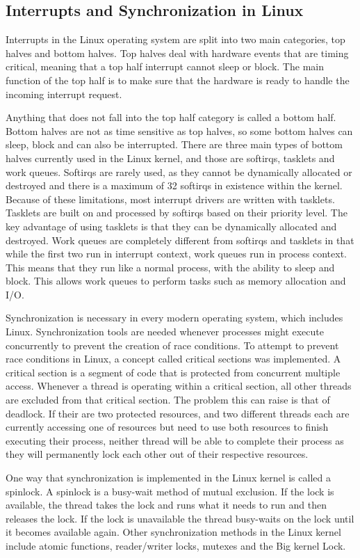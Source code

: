 \documentclass[10pt,serif,draftclsnofoot,onecolumn]{IEEEtran}
\begin{document}
	\subsection{Interrupts and Synchronization in Linux}
	\par
			Interrupts in the Linux operating system are split into two main categories, top halves and bottom halves. Top halves deal with hardware events that are timing critical, meaning that a top half interrupt cannot sleep or block. The main function of the top half is to make sure that the hardware is ready to handle the incoming interrupt request.
	\newline
	\par
			Anything that does not fall into the top half category is called a bottom half. Bottom halves are not as time sensitive as top halves, so some bottom halves can sleep, block and can also be interrupted. There are three main types of bottom halves currently used in the Linux kernel, and those are softirqs, tasklets and work queues\cite{20}. Softirqs are rarely used, as they cannot be dynamically allocated or destroyed and there is a maximum of 32 softirqs in existence within the kernel. Because of these limitations, most interrupt drivers are written with tasklets. Tasklets are built on and processed by softirqs based on their priority level. The key advantage of using tasklets is that they can be dynamically allocated and destroyed\cite{20}. Work queues are completely different from softirqs and tasklets in that while the first two run in interrupt context, work queues run in process context. This means that they run like a normal process, with the ability to sleep and block. This allows work queues to perform tasks such as memory allocation and I/O.
	\newline
	\par
			Synchronization is necessary in every modern operating system, which includes Linux. Synchronization tools are needed whenever processes might execute concurrently to prevent the creation of race conditions. To attempt to prevent race conditions in Linux, a concept called critical sections was implemented. A critical section is a segment of code that is protected from concurrent multiple access\cite{21}. Whenever a thread is operating within a critical section, all other threads are excluded from that critical section. The problem this can raise is that of deadlock. If their are two protected resources, and two different threads each are currently accessing one of resources but need to use both resources to finish executing their process, neither thread will be able to complete their process as they will permanently lock each other out of their respective resources.
	\newline
	\par
			One way that synchronization is implemented in the Linux kernel is called a spinlock. A spinlock is a busy-wait method of mutual exclusion. If the lock is available, the thread takes the lock and runs what it needs to run and then releases the lock. If the lock is unavailable the thread busy-waits on the lock until it becomes available again\cite{21}. Other synchronization methods in the Linux kernel include atomic functions, reader/writer locks, mutexes and the Big kernel Lock.
\end{document}
